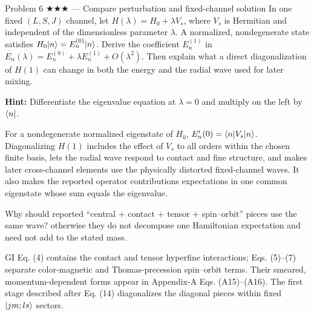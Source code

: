 \documentclass[11pt]{article}
\begin{document}
\begin{problem}{Problem 6 ★★★ — Compare perturbation and fixed-channel solution}
In one fixed $(L,S,J)$ channel, let $H(\lambda)=H_0+\lambda V_s$,
where $V_s$ is Hermitian and independent of the dimensionless parameter
$\lambda$. A normalized, nondegenerate state satisfies
$H_0\lvert n\rangle=E_n^{(0)}\lvert n\rangle$.
Derive the coefficient $E_n^{(1)}$ in
$E_n(\lambda)=E_n^{(0)}+\lambda E_n^{(1)}+O(\lambda^2)$.
Then explain what a direct diagonalization of $H(1)$ can change in both
the energy and the radial wave used for later mixing.

\textbf{Hint:} Differentiate the eigenvalue equation at $\lambda=0$
and multiply on the left by $\langle n\rvert$.
\end{problem}
\begin{solution}
For a nondegenerate normalized eigenstate of $H_0$,
$E_n'(0)=\langle n\rvert V_s\lvert n\rangle$. Diagonalizing $H(1)$ includes the effect of $V_s$
to all orders within the chosen finite basis, lets the radial wave respond to
contact and fine structure, and makes
later cross-channel elements use the physically distorted fixed-channel waves.
It also makes the reported operator contributions expectations in one common
eigenstate whose sum equals the eigenvalue.
\end{solution}
\begin{quiz}
Why should reported ``central + contact + tensor + spin--orbit'' pieces use the
same wave? \answer otherwise they do not decompose one Hamiltonian expectation
and need not add to the stated mass.
\end{quiz}

\begin{paperbridge}
GI Eq. (4) contains the contact and tensor hyperfine interactions; Eqs. (5)--(7)
separate color-magnetic and Thomas-precession spin--orbit terms. Their smeared,
momentum-dependent forms appear in Appendix-A Eqs. (A15)--(A16). The first
stage described after Eq. (14) diagonalizes the diagonal pieces within fixed
$\lvert jm;ls\rangle$ sectors.
\end{paperbridge}
\end{document}
